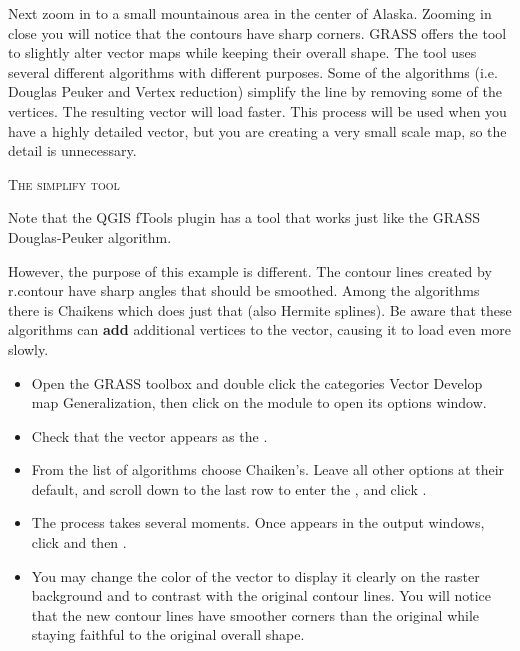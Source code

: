 Next zoom in to a small mountainous area in the center of Alaska.
Zooming in close you will notice that the contours have sharp corners. GRASS
offers the  tool to slightly alter vector maps while
keeping their overall shape. The tool uses several different algorithms with
different purposes. Some of the algorithms (i.e. Douglas Peuker and Vertex
reduction) simplify the line by removing some of the vertices. The resulting
vector will load faster. This process will be used when you have a highly
detailed vector, but you are creating a very small scale map, so the detail
is unnecessary.

\begin{Tip}\caption{\textsc{The simplify tool}}
Note that the QGIS fTools plugin has a  tool that works just like the GRASS 
Douglas-Peuker algorithm.
\end{Tip}

However, the purpose of this example is different. The contour lines created
by r.contour have sharp angles that should be smoothed. Among the
 algorithms there is Chaikens which does just that
(also Hermite splines). Be aware that these algorithms can \textbf{add}
additional vertices to the vector, causing it to load even more slowly.

\begin{itemize}[label=--]
\item Open the GRASS toolbox and double click the categories Vector \arrow
Develop map \arrow Generalization, then click on the 
module to open its options window.
\item Check that the  vector appears as the
.
\item From the list of algorithms choose Chaiken's. Leave all other options
at their default, and scroll down to the last row to enter the
, and click
.
\item The process takes several moments. Once  appears in the output windows, click  and then
.
\item You may change the color of the vector to display it clearly on the
raster background and to contrast with the original contour lines. You will
notice that the new contour lines have smoother corners than the original
while staying faithful to the original overall shape.
\end{itemize}

